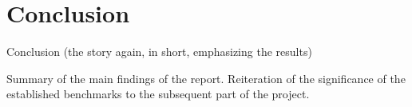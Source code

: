 \section{Conclusion}\label{sec:conclusion}
Conclusion (the story again, in short, emphasizing the results)

Summary of the main findings of the report.
Reiteration of the significance of the established benchmarks to the subsequent part of the project.
